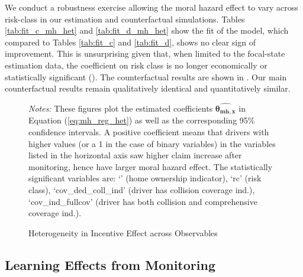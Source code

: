 We conduct a robustness exercise allowing the moral hazard effect to vary across risk-class in our estimation and counterfactual simulations. Tables \ref{tab:fit_c_mh_het} and \ref{tab:fit_d_mh_het} show the fit of the model, which compared to Tables \ref{tab:fit_c} and \ref{tab:fit_d}, shows no clear sign of improvement. This is unsurprising given that, when limited to the focal-state estimation data, the coefficient on risk class is no longer economically or statistically significant (). The counterfactual results are shown in . Our main counterfactual results remain qualitatively identical and quantitatively similar.

\begin{figure}[H]
\centering
{}
\caption{Heterogeneity in Incentive Effect across Coverage Choice \label{fig:mh_reg_het_X}}
\vspace{0.5cm}
\caption{Heterogeneity in Incentive Effect across Observables \label{fig:mh_reg_het_y}}
\vspace{0.25cm}
\begin{minipage}{0.9\textwidth}
{\footnotesize \emph{Notes:} These figures plot the estimated coefficients $\hat{\mathbf{\theta_{mh,x}}}$ in Equation (\ref{eq:mh_reg_het}) as well as the corresponding 95\% confidence intervals. A positive coefficient means that drivers with higher values (or a 1 in the case of binary variables) in the variables listed in the horizontal axis saw higher claim increase after monitoring, hence have larger moral hazard effect. The statistically significant variables are: `' (home ownership indicator), `rc' (risk class), `cov\_ded\_coll\_ind' (driver has collision coverage ind.), `cov\_ind\_fullcov' (driver has both collision and comprehensive coverage ind.). \par}
\end{minipage}
\end{figure}


\pagebreak
\subsection{Learning Effects from Monitoring}\label{subsec:app-learning}


